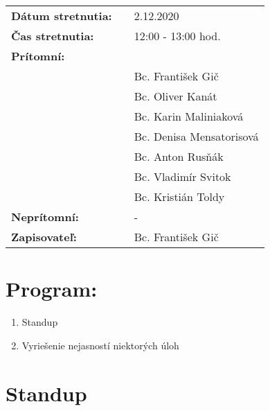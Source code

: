 \documentclass{article}
\begin{document}
    

    \begin{table}[h]
        \begin{tabular}{lllll}
            \multicolumn{3}{l}{\textbf{Dátum stretnutia:}} & & 2.12.2020 \\
            \multicolumn{3}{l}{\textbf{Čas stretnutia:}} & & 12:00 - 13:00 hod. \\
            \multicolumn{3}{l}{\textbf{Prítomní:}} \\
            & & & & Bc. František Gič  \\
            & & & & Bc. Oliver Kanát \\
            & & & & Bc. Karin Maliniaková \\
            & & & & Bc. Denisa Mensatorisová \\
            & & & & Bc. Anton Rusňák \\
            & & & & Bc. Vladimír Svitok \\
            & & & & Bc. Kristián Toldy \\
            \multicolumn{3}{l}{\textbf{Neprítomní:}} & & -\\
            \multicolumn{3}{l}{\textbf{Zapisovateľ:}} & & Bc. František Gič \\
        \end{tabular}
        \label{tab:grades}
    \end{table}

    \section*{Program:}

    \begin{enumerate}
        \item Standup
        \item Vyriešenie nejasností niektorých úloh
    \end{enumerate}

    \section*{Standup}
\end{document}
